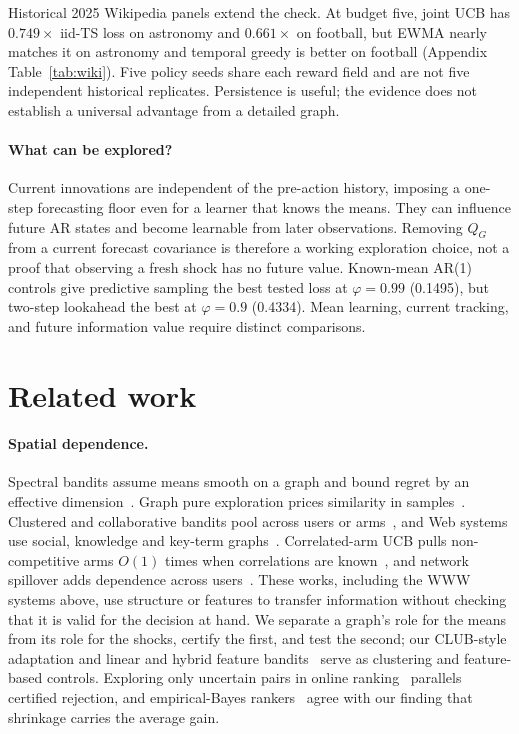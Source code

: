 \documentclass[sigconf,review,anonymous]{acmart}
\begin{document}
Historical 2025 Wikipedia panels extend the check. At budget five, joint UCB has $0.749\times$ iid-TS loss on astronomy and $0.661\times$ on football, but EWMA nearly matches it on astronomy and temporal greedy is better on football (Appendix Table~\ref{tab:wiki}). Five policy seeds share each reward field and are not five independent historical replicates. Persistence is useful; the evidence does not establish a universal advantage from a detailed graph.

\paragraph{What can be explored?} Current innovations are independent of the pre-action history, imposing a one-step forecasting floor even for a learner that knows the means. They can influence future AR states and become learnable from later observations. Removing $Q_G$ from a current forecast covariance is therefore a working exploration choice, not a proof that observing a fresh shock has no future value. Known-mean AR(1) controls give predictive sampling the best tested loss at $\varphi=0.99$ (0.1495), but two-step lookahead the best at $\varphi=0.9$ (0.4334). Mean learning, current tracking, and future information value require distinct comparisons.

\section{Related work}\label{sec:related}

\paragraph{Spatial dependence.} Spectral bandits assume means smooth on a graph and bound regret by an effective dimension~\cite{valko2014spectral,kocak2020spectral}. Graph pure exploration prices similarity in samples~\cite{thaker2022graph}. Clustered and collaborative bandits pool across users or arms~\cite{gentile2014clustering,carlsson2021clustered,ban2021local,wu2016collaborative}, and Web systems use social, knowledge and key-term graphs~\cite{zhao2022knowledge,wu2020graphneural,zhang2020conversational,li2025evoi}. Correlated-arm UCB pulls non-competitive arms $O(1)$ times when correlations are known~\cite{gupta2021correlated}, and network spillover adds dependence across users~\cite{faruk2025spillover}. These works, including the WWW systems above, use structure or features to transfer information without checking that it is valid for the decision at hand. We separate a graph's role for the means from its role for the shocks, certify the first, and test the second; our CLUB-style adaptation and linear and hybrid feature bandits~\cite{li2010linucb} serve as clustering and feature-based controls. Exploring only uncertain pairs in online ranking~\cite{jia2021pairrank} parallels certified rejection, and empirical-Bayes rankers~\cite{yang2024empirical} agree with our finding that shrinkage carries the average gain.
\end{document}
